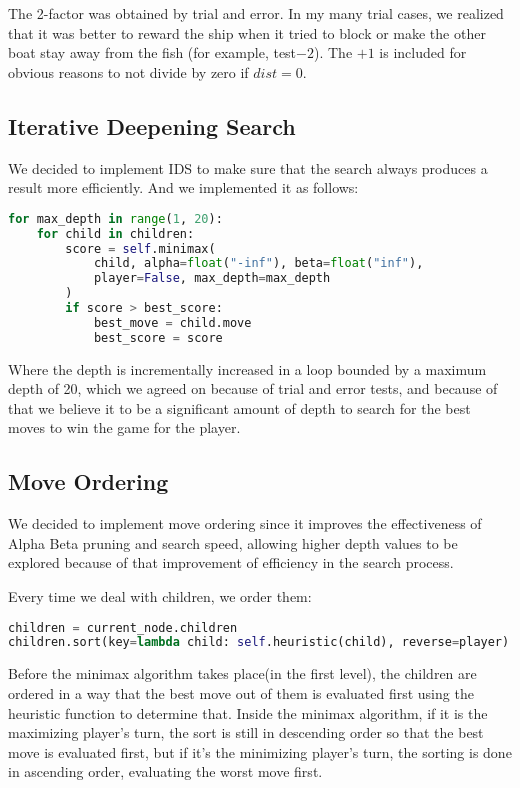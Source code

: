 \documentclass[12pt]{article}
\begin{document}
The 2-factor was obtained by trial and error. In my many trial cases, we realized that it was better to reward the ship when it tried to block or make the other boat stay away from the fish (for example, test$-2$). The $+1$ is included for obvious reasons to not divide by zero if $dist=0$.

\subsection{Iterative Deepening Search}
We decided to implement IDS to make sure that the search always produces a result more efficiently. And we implemented it as follows:

\begin{lstlisting}[language=Python, caption=Iterative deepening search implementation]
for max_depth in range(1, 20):
    for child in children:
        score = self.minimax(
            child, alpha=float("-inf"), beta=float("inf"),
            player=False, max_depth=max_depth
        )
        if score > best_score:
            best_move = child.move
            best_score = score
\end{lstlisting}
Where the depth is incrementally increased in a loop bounded by a maximum depth of 20, which we agreed on because of trial and error tests, and because of that we believe it to be a significant amount of depth to search for the best moves to win the game for the player.

\subsection{Move Ordering}
We decided to implement move ordering since it improves the effectiveness of Alpha Beta pruning and search speed, allowing higher depth values to be explored because of that improvement of efficiency in the search process.

Every time we deal with children, we order them:
\begin{lstlisting}[language=Python, caption=Move ordering implementation]
children = current_node.children
children.sort(key=lambda child: self.heuristic(child), reverse=player)
\end{lstlisting}

Before the minimax algorithm takes place(in the first level), the children are ordered in a way that the best move out of them is evaluated first using the heuristic function to determine that. Inside the minimax algorithm, if it is the maximizing player's turn, the sort is still in descending order so that the best move is evaluated first, but if it's the minimizing player's turn, the sorting is done in ascending order, evaluating the worst move first.
\end{document}
